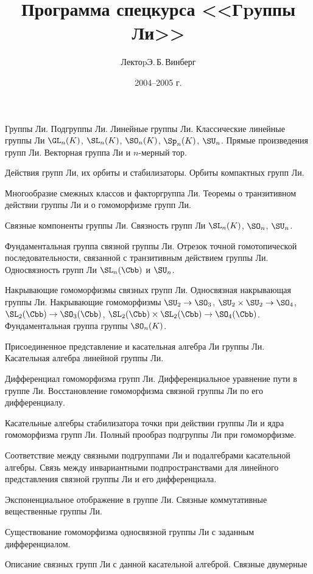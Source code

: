 \documentclass[a4paper]{article}
\title{Программа спецкурса <<Гpуппы Ли>>}
\author{Лектоp\т Э.\,Б.\,Винберг}
\date{2004--2005 г.}
\begin{document}
\maketitle

\begin{nums}{0}
\item Группы Ли. Подгруппы Ли. Линейные группы Ли. Классические линейные группы
Ли $\GL_n(K)$, $\SL_n(K)$, $\SO_n(K)$, $\Sp_n(K)$, $\SU_n$. Прямые произведения
групп Ли. Векторная группа Ли и $n$-мерный тор.
\item Действия групп Ли, их орбиты и стабилизаторы. Орбиты компактных групп Ли.
\item Многообразие смежных классов и факторгруппа Ли. Теоремы о транзитивном
действии группы Ли и о гомоморфизме групп Ли.
\item Связные компоненты группы Ли. Связность групп Ли $\SL_n(K)$, $\SO_n$, $\SU_n$.
\item Фундаментальная группа связной группы Ли. Отрезок точной гомотопической
последовательности, связанной с транзитивным действием группы Ли.
Односвязность групп Ли $\SL_n({\Cbb})$ и $\SU_n$.
\item Накрывающие гомоморфизмы связных групп Ли. Односвязная накрывающая группы Ли.
Накрывающие гомоморфизмы $\SU_2\to \SO_3$, $\SU_2\times \SU_2\to \SO_4$,
$\SL_2(\Cbb)\to \SO_3(\Cbb)$, $\SL_2(\Cbb)\times \SL_2(\Cbb)\to \SO_4(\Cbb)$.
Фундаментальная группа группы $\SO_n(K)$.
\item Присоединенное представление и касательная алгебра Ли группы Ли. Касательная
алгебра линейной группы Ли.
\item Дифференциал гомоморфизма групп Ли. Дифференциальное уравнение пути в группе Ли.
Восстановление гомоморфизма связной группы Ли по его дифференциалу.
\item Касательные алгебры стабилизатора точки при действии группы Ли и ядра
гомоморфизма групп Ли. Полный прообраз подгруппы Ли при гомоморфизме.
\item Соответствие между связными подгруппами Ли и подалгебрами касательной алгебры.
Связь между инвариантными подпространствами для линейного представления связной
группы Ли и его дифференциала.
\item Экспоненциальное отображение в группе Ли. Связные коммутативные вещественные
группы Ли.
\item Существование гомоморфизма односвязной группы Ли с заданным дифференциалом.
\item Описание связных групп Ли с данной касательной алгеброй. Связные двумерные

\end{nums}
\end{document}
